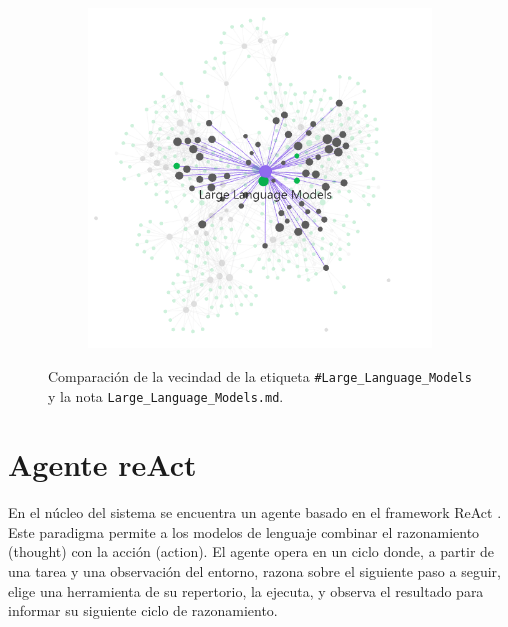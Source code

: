 \begin{figure}[h!]
\begin{subfigure}[b]{0.48\textwidth}
        \includegraphics[width=\textwidth]{figures/LLM_note_graph.png}
        \label{fig:llm_note}
    \end{subfigure}
    \caption{Comparación de la vecindad de la etiqueta \texttt{\#Large\_Language\_Models} y la nota \texttt{Large\_Language\_Models.md}.}
    \label{fig:obsidian_force_graph_example}
\end{figure}

\section{Agente reAct}
En el núcleo del sistema se encuentra un agente basado en el framework ReAct \parencite{yaoReActSynergizingReasoning2023}. Este paradigma permite a los modelos de lenguaje combinar el razonamiento (thought) con la acción (action). El agente opera en un ciclo donde, a partir de una tarea y una observación del entorno, razona sobre el siguiente paso a seguir, elige una herramienta de su repertorio, la ejecuta, y observa el resultado para informar su siguiente ciclo de razonamiento.


